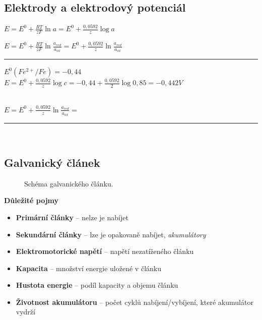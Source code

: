\newpage

\subsection{Elektrody a elektrodový potenciál}

$E = E^0 + \frac{RT}{zF}\ln a = E^0 + \frac{0,0592}{z}\log a$

$E = E^0 + \frac{RT}{zF}\ln \frac{a_{red}}{a_{ox}} = E^0 + \frac{0,0592}{z}\ln \frac{a_{red}}{a_{ox}}$\\

\hrule


$E^0 (Fe^{2+}/Fe) = -0,44$\\

$E = E^0 + \frac{0,0592}{z}\log c = -0,44 + \frac{0,0592}{2}\log 0,85 = -0,442 V$

\\

$E = E^0 + \frac{0,0592}{z}\ln \frac{a_{red}}{a_{ox}} = $\\

\hrule


\\

\newpage

\subsection{Galvanický článek}

\begin{figure}[h]
	\caption[Schéma galvanického článku.]{Schéma galvanického článku.\footnotemark}
\end{figure}

\textbf{Důležité pojmy}
\begin{itemize}
	\item \textbf{Primární články} -- nelze je nabíjet
	\item \textbf{Sekundární články} -- lze je opakovaně nabíjet, \textit{akumulátory}
	\item \textbf{Elektromotorické napětí} -- napětí nezatíženého článku
	\item \textbf{Kapacita} -- množství energie uložené v článku
	\item \textbf{Hustota energie} -- podíl kapacity a objemu článku
	\item \textbf{Životnost akumulátoru} -- počet cyklů nabíjení/vybíjení, které akumulátor vydrží
\end{itemize}

